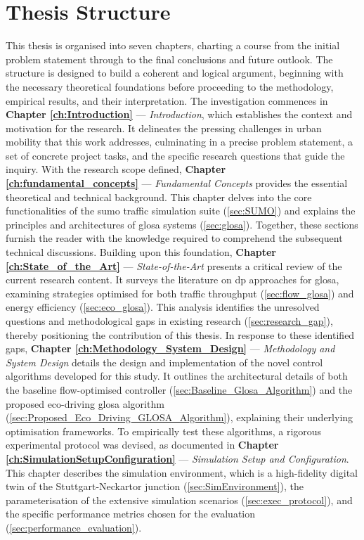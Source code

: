 \section{Thesis Structure}
\label{sec:Thesis_Structure}

This thesis is organised into seven chapters, charting a course from the initial problem statement through to the final conclusions and future outlook. The structure is designed to build a coherent and logical argument, beginning with the necessary theoretical foundations before proceeding to the methodology, empirical results, and their interpretation.
\mynewline
The investigation commences in \textbf{Chapter \ref{ch:Introduction}} --- \textit{Introduction}, which establishes the context and motivation for the research. It delineates the pressing challenges in urban mobility that this work addresses, culminating in a precise problem statement, a set of concrete project tasks, and the specific research questions that guide the inquiry.
\mynewline
With the research scope defined, \textbf{Chapter \ref{ch:fundamental_concepts}} --- \textit{Fundamental Concepts} provides the essential theoretical and technical background. This chapter delves into the core functionalities of the \ac{sumo} traffic simulation suite (\vref{sec:SUMO}) and explains the principles and architectures of \ac{glosa} systems (\vref{sec:glosa}). Together, these sections furnish the reader with the knowledge required to comprehend the subsequent technical discussions.
\mynewline
Building upon this foundation, \textbf{Chapter \ref{ch:State_of_the_Art}} --- \textit{State-of-the-Art} presents a critical review of the current research content. It surveys the literature on \ac{dp} approaches for \ac{glosa}, examining strategies optimised for both traffic throughput (\vref{sec:flow_glosa}) and energy efficiency (\ref{sec:eco_glosa}). This analysis identifies the unresolved questions and methodological gaps in existing research (\vref{sec:research_gap}), thereby positioning the contribution of this thesis.
\mynewline
In response to these identified gaps, \textbf{Chapter \ref{ch:Methodology_System_Design}} --- \textit{Methodology and System Design} details the design and implementation of the novel control algorithms developed for this study. It outlines the architectural details of both the baseline flow-optimised controller (\vref{sec:Baseline_Glosa_Algorithm}) and the proposed eco-driving \ac{glosa} algorithm (\vref{sec:Proposed_Eco_Driving_GLOSA_Algorithm}), explaining their underlying optimisation frameworks.
\mynewline
To empirically test these algorithms, a rigorous experimental protocol was devised, as documented in \textbf{Chapter \ref{ch:SimulationSetupConfiguration}} --- \textit{Simulation Setup and Configuration}. This chapter describes the simulation environment, which is a high-fidelity digital twin of the Stuttgart-Neckartor junction (\vref{sec:SimEnvironment}), the parameterisation of the extensive simulation scenarios (\vref{sec:exec_protocol}), and the specific performance metrics chosen for the evaluation (\vref{sec:performance_evaluation}).
